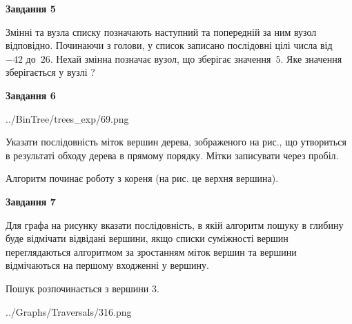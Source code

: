 \documentclass[12pt, ukrainian]{article}
\begin{document}
{\begin {large}
{\begin {center}\textbf{Завдання 5}\end {center}}\par
Змінні  та  вузла списку позначають наступний та попередній за ним вузол відповідно. Починаючи з голови, у список записано послідовні цілі числа від~$-42$ до~$26$. Нехай змінна  позначає вузол, що зберігає значення~$5$.
Яке значення зберігається у вузлі  ?\par
\newpage

{\begin {center}\textbf{Завдання 6}\end {center}}\par

\begin{center}
	{../BinTree/trees_exp/69.png}
\end{center}
Указати послідовність міток вершин дерева, зображеного на рис., що утвориться в результаті обходу дерева в прямому порядку. Мітки записувати через пробіл.\par Алгоритм починає роботу з кореня (на рис. це верхня вершина).\par
\newpage

{\begin {center}\textbf{Завдання 7}\end {center}}\par
Для графа на рисунку вказати послідовність, в якій алгоритм пошуку в глибину буде відмічати відвідані вершини, якщо списки суміжності вершин переглядаються алгоритмом за зростанням міток вершин та вершини відмічаються на першому вход\-женні у вершину.\par
Пошук розпочинається з вершини 3.\par

\begin{center}
	{../Graphs/Traversals/316.png}
\end{center}\par
\newpage


\end{large}}
\end{document}
